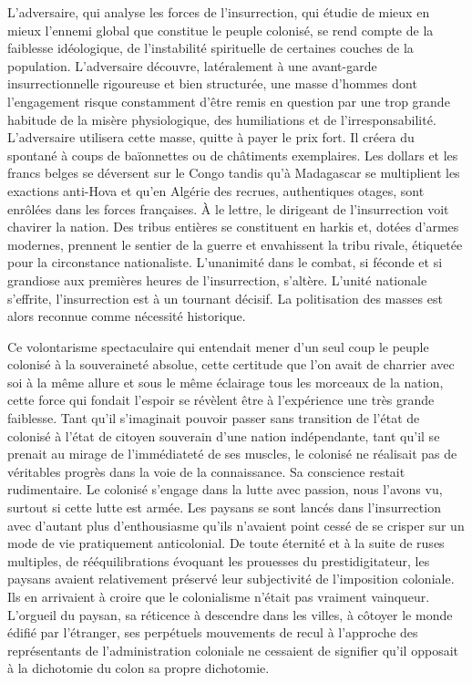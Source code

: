 \documentclass[french,twoside]{book} %
\begin{document}
L’adversaire, qui analyse les forces de l’insurrection, qui étudie de mieux en mieux l’ennemi global que constitue le peuple colonisé, se rend compte de la faiblesse idéologique, de l’instabilité spirituelle de certaines couches de la population. L’adversaire découvre, latéralement à une avant-garde insurrectionnelle rigoureuse et bien structurée, une masse d’hommes dont l’engagement risque constamment d’être remis en question par une trop grande habitude de la misère physiologique, des humiliations et de l’irresponsabilité. L’adversaire utilisera cette masse, quitte à payer le prix fort. Il créera du spontané à coups de baïonnettes ou de châtiments exemplaires. Les dollars et les francs belges se déversent sur le Congo tandis qu’à Madagascar se multiplient les exactions anti-Hova et qu’en Algérie des recrues, authentiques otages, sont enrôlées dans les forces françaises. À le lettre, le dirigeant de l’insurrection voit chavirer la nation. Des tribus entières se constituent en harkis et, dotées d’armes modernes, prennent le sentier de la guerre et envahissent la tribu rivale, étiquetée pour la circonstance nationaliste.   L’unanimité dans le combat, si féconde et si grandiose aux premières heures de l’insurrection, s’altère. L’unité nationale s’effrite, l’insurrection est à un tournant décisif. La politisation des masses est alors reconnue comme nécessité historique.\par
\bigbreak
\noindent Ce volontarisme spectaculaire qui entendait mener d’un seul coup le peuple colonisé à la souveraineté absolue, cette certitude que l’on avait de charrier avec soi à la même allure et sous le même éclairage tous les morceaux de la nation, cette force qui fondait l’espoir se révèlent être à l’expérience une très grande faiblesse. Tant qu’il s’imaginait pouvoir passer sans transition de l’état de colonisé à l’état de citoyen souverain d’une nation indépendante, tant qu’il se prenait au mirage de l’immédiateté de ses muscles, le colonisé ne réalisait pas de véritables progrès dans la voie de la connaissance. Sa conscience restait rudimentaire. Le colonisé s’engage dans la lutte avec passion, nous l’avons vu, surtout si cette lutte est armée. Les paysans se sont lancés dans l’insurrection avec d’autant plus d’enthousiasme qu’ils n’avaient point cessé de se crisper sur un mode de vie pratiquement anticolonial. De toute éternité et à la suite de ruses multiples, de rééquilibrations évoquant les prouesses du prestidigitateur, les paysans avaient relativement préservé leur subjectivité de l’imposition coloniale. Ils en arrivaient à croire que le colonialisme n’était pas vraiment vainqueur. L’orgueil du paysan, sa réticence à descendre dans les villes, à côtoyer le monde édifié par l’étranger, ses perpétuels mouvements de recul à l’approche des représentants de l’administration coloniale ne cessaient de signifier qu’il opposait à la dichotomie du colon sa propre dichotomie.\par
\end{document}
